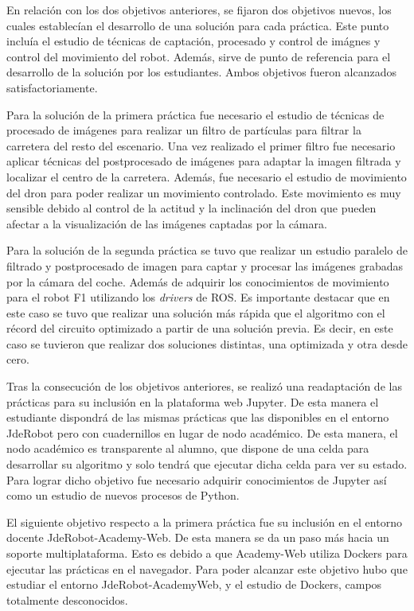 En relación con los dos objetivos anteriores, se fijaron dos objetivos nuevos, los cuales establecían el desarrollo de una solución para cada práctica. Este punto incluía el estudio de técnicas de captación, procesado y control de imágnes y control del movimiento del robot. Además, sirve de punto de referencia para el desarrollo de la solución por los estudiantes. Ambos objetivos fueron alcanzados satisfactoriamente.

Para la solución de la primera práctica fue necesario el estudio de técnicas de procesado de imágenes para realizar un filtro de partículas para filtrar la carretera del resto del escenario. Una vez realizado el primer filtro fue necesario aplicar técnicas del postprocesado de imágenes para adaptar la imagen filtrada y localizar el centro de la carretera. Además, fue necesario el estudio de movimiento del dron para poder realizar un movimiento controlado. Este movimiento es muy sensible debido al control de la actitud y la inclinación del dron que pueden afectar a la visualización de las imágenes captadas por la cámara.

Para la solución de la segunda práctica se tuvo que realizar un estudio paralelo de filtrado y postprocesado de imagen para captar y procesar las imágenes grabadas por la cámara del coche. Además de adquirir los conocimientos de movimiento para el robot F1 utilizando los \textit{drivers} de ROS. Es importante destacar que en este caso se tuvo que realizar una solución más rápida que el algoritmo con el récord del circuito optimizado a partir de una solución previa. Es decir, en este caso se tuvieron que realizar dos soluciones distintas, una optimizada y otra desde cero.

Tras la consecución de los objetivos anteriores, se realizó una readaptación de las prácticas para su inclusión en la plataforma web Jupyter. De esta manera el estudiante dispondrá de las mismas prácticas que las disponibles en el entorno JdeRobot pero con cuadernillos en lugar de nodo académico. De esta manera, el nodo académico es transparente al alumno, que dispone de una celda para desarrollar su algoritmo y solo tendrá que ejecutar dicha celda para ver su estado.
Para lograr dicho objetivo fue necesario adquirir conocimientos de Jupyter así como un estudio de nuevos procesos de Python.

El siguiente objetivo respecto a la primera práctica fue su inclusión en el entorno docente JdeRobot-Academy-Web. De esta manera se da un paso más hacia un soporte multiplataforma. Esto es debido a que Academy-Web utiliza Dockers para ejecutar las prácticas en el navegador. Para poder alcanzar este objetivo hubo que estudiar el entorno JdeRobot-AcademyWeb, y el estudio de Dockers, campos totalmente desconocidos.

